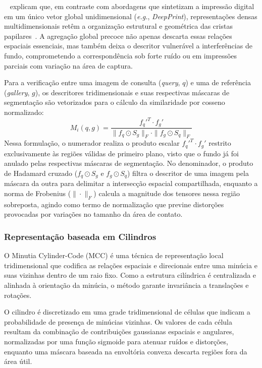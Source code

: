 ~ explicam que, em contraste com abordagens que sintetizam a impressão digital em um único vetor global unidimensional (\textit{e.g.}, \textit{DeepPrint}), representações densas multidimensionais retêm a organização estrutural e geométrica das cristas papilares~. A agregação global precoce não apenas descarta essas relações espaciais essenciais, mas também deixa o descritor vulnerável a interferências de fundo, comprometendo a correspondência sob forte ruído ou em impressões parciais com variação na área de captura.

Para a verificação entre uma imagem de consulta (\textit{query}, $q$) e uma de referência (\textit{gallery}, $g$), os descritores tridimensionais e suas respectivas máscaras de segmentação são vetorizados para o cálculo da similaridade por cosseno normalizado:
\begin{equation}
    M_i(q, g) = \frac{{f_q'}^T \cdot f_g'}{\|f_q \odot S_g\|_F \cdot \|f_g \odot S_q\|_F}
\end{equation}
Nessa formulação, o numerador realiza o produto escalar ${f_q'}^T \cdot f_g'$ restrito exclusivamente às regiões válidas de primeiro plano, visto que o fundo já foi anulado pelas respectivas máscaras de segmentação. No denominador, o produto de Hadamard cruzado ($f_q \odot S_g$ e $f_g \odot S_q$) filtra o descritor de uma imagem pela máscara da outra para delimitar a intersecção espacial compartilhada, enquanto a norma de Frobenius ($\|\cdot\|_F$) calcula a magnitude dos tensores nessa região sobreposta, agindo como termo de normalização que previne distorções provocadas por variações no tamanho da área de contato.


\subsubsection{Representação baseada em Cilindros}\label{subsubsec:mcc-alg}

O Minutia Cylinder-Code (MCC) é uma técnica de representação local tridimensional que codifica as relações espaciais e direcionais entre uma minúcia e suas vizinhas dentro de um raio fixo. Como a estrutura cilíndrica é centralizada e alinhada à orientação da minúcia, o método garante invariância a translações e rotações.

O cilindro é discretizado em uma grade tridimensional de células que indicam a probabilidade de presença de minúcias vizinhas. Os valores de cada célula resultam da combinação de contribuições gaussianas espaciais e angulares, normalizadas por uma função sigmoide para atenuar ruídos e distorções, enquanto uma máscara baseada na envoltória convexa descarta regiões fora da área útil.

